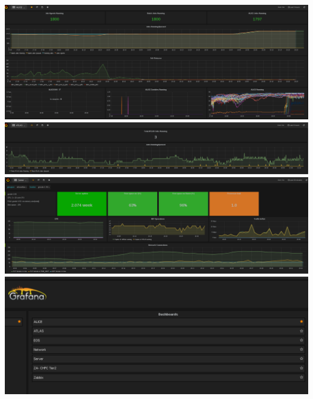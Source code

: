 \documentclass{beamer}
\begin{document}
\begin{frame}
  \includegraphics[scale=0.25]{ALICEProcessing-Grafana.pdf}\\
  \includegraphics[scale=0.25]{ATLASProcessing-Grafana.pdf}\\
  \includegraphics[scale=0.25]{Server50-Grafana.pdf}\\
  \includegraphics[scale=0.25]{GrafanaMenu.pdf}
\end{frame}
\end{document}
